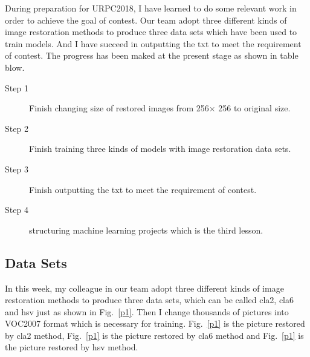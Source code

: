 \documentclass[a4paper]{article}
\begin{document}
During preparation for URPC2018, I have learned to do some relevant work in order to achieve the goal of contest. Our team adopt three different kinds of image restoration methods to produce three data sets which have been used to train models. And I have succeed in outputting the txt to meet the requirement of contest. The progress has been maked at the present stage as shown in table blow.
\begin{description}
	\item [Step 1] Finish changing size of restored images from 256$\times$ 256 to original size.
	\item[Step 2] Finish training three kinds of models with image restoration data sets.
	\item[Step 3] Finish outputting the txt to meet the requirement of contest.
	\item[Step 4] structuring machine learning projects which is the third lesson.\label{t2}
\end{description}

\subsection{Data Sets}
In this week, my colleague in our team adopt three different kinds of image restoration methods to produce three data sets, which can be called cla2, cla6 and hsv just as shown in Fig.~\ref{p1}. Then I change thousands of pictures into VOC2007 format which is necessary for training. Fig.~\ref{p1} is the picture restored by cla2 method, Fig.~\ref{p1} is the picture restored by cla6 method and Fig.~\ref{p1} is the picture restored by hsv method.
\end{document}
